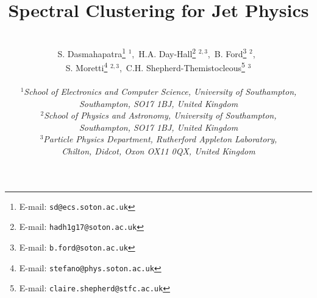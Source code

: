 \documentclass[12pt]{article}
\begin{document}
\title{\hfill ~\\[-50mm]
                  \textbf{Spectral Clustering for Jet Physics
                }        }

\author{\\[-5mm]
S. Dasmahapatra\footnote{E-mail: {\tt sd@ecs.soton.ac.uk}} $^{1}$,\
H.A. Day-Hall\footnote{E-mail: {\tt hadh1g17@soton.ac.uk}} $^{2,3}$,\
B. Ford\footnote{E-mail: {\tt b.ford@soton.ac.uk}} $^{2}$,\ \\
S. Moretti\footnote{E-mail: {\tt stefano@phys.soton.ac.uk}} $^{2,3}$,\
C.H. Shepherd-Themistocleous\footnote{E-mail: {\tt claire.shepherd@stfc.ac.uk}} $^{3}$
\\ \\
\emph{\small $^1$School of Electronics and Computer Science, University of Southampton,}\\
\emph{\small Southampton, SO17 1BJ, United Kingdom}\\
\emph{\small $^2$School of Physics and Astronomy, University of Southampton,}\\
\emph{\small Southampton, SO17 1BJ, United Kingdom}\\
\emph{\small  $^3$Particle Physics Department, Rutherford Appleton Laboratory,}\\
\emph{\small Chilton, Didcot, Oxon OX11 0QX, United Kingdom}\\[4mm]
 }
%
\maketitle
%
\vspace*{-10mm}
%
\end{document}
